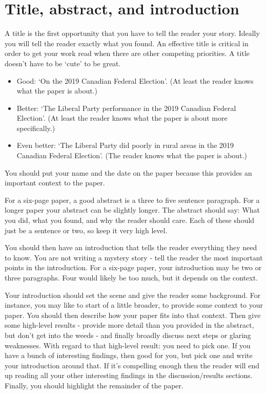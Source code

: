 \documentclass[
]{book}
\providecommand{\tightlist}{%
  \setlength{\itemsep}{0pt}\setlength{\parskip}{0pt}}
\begin{document}
\hypertarget{title-abstract-and-introduction}{%
\section{Title, abstract, and introduction}\label{title-abstract-and-introduction}}

A title is the first opportunity that you have to tell the reader your story. Ideally you will tell the reader exactly what you found. An effective title is critical in order to get your work read when there are other competing priorities. A title doesn't have to be `cute' to be great.

\begin{itemize}
\tightlist
\item
  Good: `On the 2019 Canadian Federal Election'. (At least the reader knows what the paper is about.)
\item
  Better: `The Liberal Party performance in the 2019 Canadian Federal Election'. (At least the reader knows what the paper is about more specifically.)
\item
  Even better: `The Liberal Party did poorly in rural areas in the 2019 Canadian Federal Election'. (The reader knows what the paper is about.)
\end{itemize}

You should put your name and the date on the paper because this provides an important context to the paper.

For a six-page paper, a good abstract is a three to five sentence paragraph. For a longer paper your abstract can be slightly longer. The abstract should say: What you did, what you found, and why the reader should care. Each of these should just be a sentence or two, so keep it very high level.

You should then have an introduction that tells the reader everything they need to know. You are not writing a mystery story - tell the reader the most important points in the introduction. For a six-page paper, your introduction may be two or three paragraphs. Four would likely be too much, but it depends on the context.

Your introduction should set the scene and give the reader some background. For instance, you may like to start of a little broader, to provide some context to your paper. You should then describe how your paper fits into that context. Then give some high-level results - provide more detail than you provided in the abstract, but don't get into the weeds - and finally broadly discuss next steps or glaring weaknesses. With regard to that high-level result: you need to pick one. If you have a bunch of interesting findings, then good for you, but pick one and write your introduction around that. If it's compelling enough then the reader will end up reading all your other interesting findings in the discussion/results sections. Finally, you should highlight the remainder of the paper.
\end{document}
